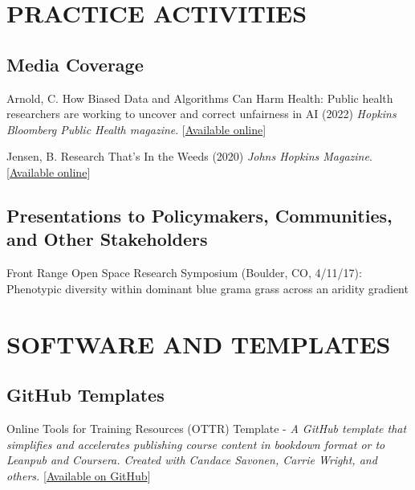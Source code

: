 \documentclass{cv}
\begin{document}

\section*{PRACTICE ACTIVITIES}

\subsection*{Media Coverage}

Arnold, C. How Biased Data and Algorithms Can Harm Health: Public health researchers are working to uncover and correct unfairness in AI (2022) \textit{Hopkins Bloomberg Public Health magazine}. [\href{https://magazine.publichealth.jhu.edu/2022/how-biased-data-and-algorithms-can-harm-health}{Available online}]

Jensen, B. Research That's In the Weeds (2020) \textit{Johns Hopkins Magazine}. [\href{https://hub.jhu.edu/magazine/2020/winter/ava-hoffman-urban-ecology/}{Available online}]

\subsection*{Presentations to Policymakers, Communities, and Other Stakeholders}

Front Range Open Space Research Symposium (Boulder, CO, 4/11/17): Phenotypic diversity within dominant blue grama grass across an aridity gradient


\section*{SOFTWARE AND TEMPLATES}

\subsection*{GitHub Templates}

Online Tools for Training Resources (OTTR) Template - \textit{A GitHub template that simplifies and accelerates publishing course content in bookdown format or to Leanpub and Coursera. Created with Candace Savonen, Carrie Wright, and others.} [\href{https://github.com/jhudsl/OTTR_Template}{Available on GitHub}]
\end{document}
